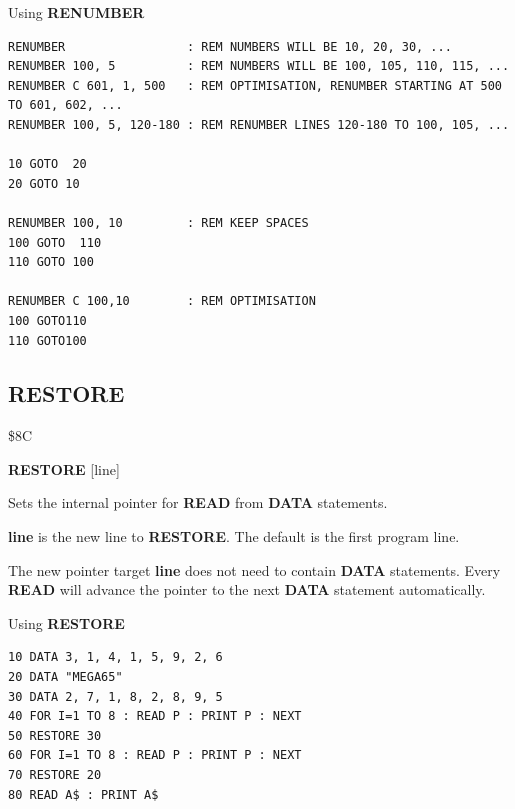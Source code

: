 \begin{description}[leftmargin=2cm,style=nextline]
\item [Examples:] Using {\bf RENUMBER}

\begin{tcolorbox}[colback=black,coltext=white]
\verbatimfont{\codefont}
\begin{verbatim}
RENUMBER                 : REM NUMBERS WILL BE 10, 20, 30, ...
RENUMBER 100, 5          : REM NUMBERS WILL BE 100, 105, 110, 115, ...
RENUMBER C 601, 1, 500   : REM OPTIMISATION, RENUMBER STARTING AT 500 TO 601, 602, ...
RENUMBER 100, 5, 120-180 : REM RENUMBER LINES 120-180 TO 100, 105, ...

10 GOTO  20
20 GOTO 10

RENUMBER 100, 10         : REM KEEP SPACES
100 GOTO  110
110 GOTO 100

RENUMBER C 100,10        : REM OPTIMISATION
100 GOTO110
110 GOTO100
\end{verbatim}
\end{tcolorbox}
\end{description}


\newpage
\subsection{RESTORE}
\begin{description}[leftmargin=2cm,style=nextline]
\item [Token:]    \$8C

\item [Format:]   {\bf RESTORE} [line]

\item [Usage:]    Sets the internal pointer for {\bf READ} from {\bf DATA} statements.

                  {\bf line} is the new line to {\bf RESTORE}. The default is the first program line.

\item [Remarks:]  The new pointer target {\bf line} does not need to contain {\bf DATA} statements. Every {\bf READ} will advance the pointer to the next {\bf DATA} statement automatically.

\item [Example:]  Using {\bf RESTORE}

\begin{tcolorbox}[colback=black,coltext=white]
\verbatimfont{\codefont}
\begin{verbatim}
10 DATA 3, 1, 4, 1, 5, 9, 2, 6
20 DATA "MEGA65"
30 DATA 2, 7, 1, 8, 2, 8, 9, 5
40 FOR I=1 TO 8 : READ P : PRINT P : NEXT
50 RESTORE 30
60 FOR I=1 TO 8 : READ P : PRINT P : NEXT
70 RESTORE 20
80 READ A$ : PRINT A$
\end{verbatim}
\end{tcolorbox}
\end{description}

